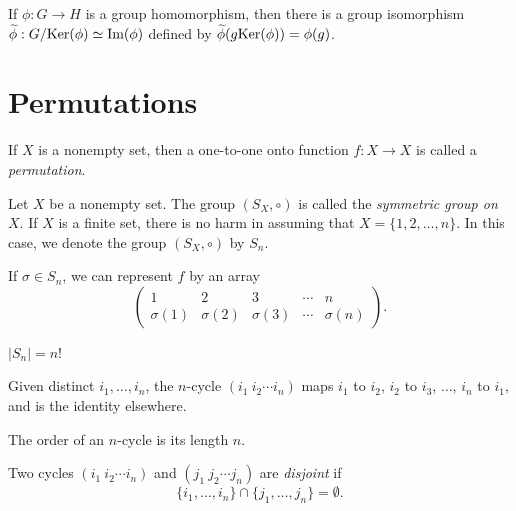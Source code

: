 \begin{theorem}
	If $\phi : G \rightarrow H$ is a group homomorphism, then there is a group
	isomorphism $\widetilde{\phi} : G/\text{Ker}(\phi) \simeq \text{Im}(\phi)$ defined
	by $\widetilde{\phi}(g \text{Ker}(\phi)) = \phi(g)$.
\end{theorem}

\section*{Permutations}

\begin{definition}
	If $X$ is a nonempty set, then a one-to-one onto function $f : X \rightarrow
	X$ is called a \emph{permutation}.
\end{definition}

\begin{definition}
	Let $X$ be a nonempty set. The group $(S_X, \circ)$ is called the
	\emph{symmetric group on $X$}. If $X$ is a finite set, there is no harm in
	assuming that $X = \{1, 2, \dots, n\}$. In this case, we denote the group
	$(S_X, \circ)$ by $S_n$.
\end{definition}

\begin{notation}
	If $\sigma \in S_n$, we can represent $f$ by an array
	\[
		\begin{pmatrix}
			1 & 2 & 3 & \cdots & n \\
			\sigma(1) & \sigma(2) & \sigma(3) & \cdots & \sigma(n)
		\end{pmatrix}.
	\]
\end{notation}

\begin{fact}
	$|S_n| = n$!
\end{fact}

\begin{definition}
	Given distinct $i_1, \dots, i_n$, the $n$-cycle $(i_1 \ i_2 \cdots i_n)$ maps
	$i_1$ to $i_2$, $i_2$ to $i_3$, $\dots$, $i_n$ to $i_1$, and is the identity
	elsewhere.
\end{definition}

\begin{fact}
	The order of an $n$-cycle is its length $n$.
\end{fact}

\begin{definition}
	Two cycles $(i_1 \ i_2 \cdots i_n)$ and $(j_1 \ j_2 \cdots j_n)$ are
	\emph{disjoint} if
	\[
		\{i_1, \dots, i_n\} \cap \{j_1, \dots, j_n\} = \emptyset.
	\]
\end{definition}

